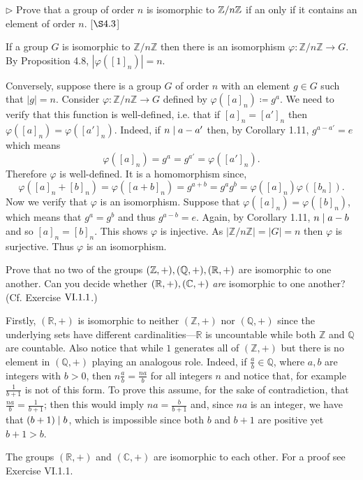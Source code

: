 \begin{exercise}
	$\triangleright$ Prove that a group of order $n$ is isomorphic to $\mathbb{Z}/n\mathbb{Z}$ if an only if it contains an element of order $n$. [$\S 4.3$]
\end{exercise}
\begin{solution}
	If a group $G$ is isomorphic to $\mathbb{Z}/n\mathbb{Z}$ then there is an isomorphism \hbox{$\varphi\colon \mathbb{Z}/n\mathbb{Z} \to G$}. By Proposition 4.8, $|\varphi([1]_n)| = n$. 
	
	Conversely, suppose there is a group $G$ of order $n$ with an element $g\in G$ such that $|g| = n$. Consider $\varphi\colon \mathbb{Z}/n\mathbb{Z}\to G$ defined by $\varphi([a]_n) \coloneqq g^a$. We need to verify that this function is well-defined, i.e. that if $[a]_n = [a']_n$ then $\varphi([a]_n) = \varphi([a']_n)$. Indeed, if $n\mid a-a'$ then, by Corollary 1.11, $g^{a-a'} = e$ which means
	\[
		\varphi([a]_n) = g^a  = g^{a'} = \varphi([a']_n).
	\]
	Therefore $\varphi$ is well-defined. It is a homomorphism since, 
	\[
		\varphi([a]_n + [b]_n) = \varphi([a+b]_n) = g^{a+b} = g^ag^b = \varphi([a]_n)\varphi([b_n]).
	\]
	Now we verify that $\varphi$ is an isomorphism. Suppose that $\varphi([a]_n) = \varphi([b]_n)$, which means that $g^a = g^b$ and thus $g^{a-b} = e$. Again, by Corollary 1.11, $n\mid a-b$ and so $[a]_n = [b]_n$. This shows $\varphi$ is injective. As $|\mathbb{Z}/n\mathbb{Z}| = |G| =n$ then $\varphi$ is surjective. Thus $\varphi$ is an isomorphism. 
\end{solution}

\begin{exercise}
	Prove that no two of the groups $(\mathbb{Z}, +), (\mathbb{Q}, +), (\mathbb{R},+)$ are isomorphic to one another. Can you decide whether $(\mathbb{R},+),(\mathbb{C},+)$ \emph{are} isomorphic to one another? (Cf. Exercise $\RNo{6}.1.1$.)
\end{exercise}
\begin{solution}
	Firstly, $(\mathbb{R},+)$ is isomorphic to neither $(\mathbb{Z},+)$ nor $(\mathbb{Q}, +)$ since the underlying sets have different cardinalities---$\mathbb{R}$ is uncountable while both $\mathbb{Z}$ and $\mathbb{Q}$ are countable. Also notice that while $1$ generates all of $(\mathbb{Z},+)$ but there is no element in $(\mathbb{Q},+)$ playing an analogous role. Indeed, if $\frac{a}{b}\in \mathbb{Q}$, where $a,b$ are integers with $b>0$, then $n\frac{a}{b} = \frac{na}{b}$ for all integers $n$ and notice that, for example $\frac{1}{b+1}$ is not of this form. To prove this assume, for the sake of contradiction, that $\frac{na}{b} = \frac{1}{b+1}$; then this would imply $na = \frac{b}{b+1}$ and, since $na$ is an integer, we have that $(b+1)\mid b$, which is impossible since both $b$ and $b+1$ are positive yet $b + 1 > b$. 
	
	The groups $(\mathbb{R},+)$ and $(\mathbb{C},+)$ are isomorphic to each other. For a proof see Exercise VI.1.1.
\end{solution}

